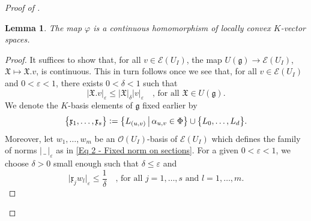 \documentclass[a4paper, reqno, 10pt]{amsart}
\newtheorem{lemma}[theorem]{Lemma}
\theoremstyle{definition}
\numberwithin{equation}{section}
\newcommand{\abs}[1]{{\lvert{#1}\rvert}}
\newcommand{\blank}{{\,\_\,}}
\newcommand{\defeq}{\vcentcolon=}
\newcommand{\mto}{\mapsto}
\newcommand{\ra}{\rightarrow}
\newcommand{\CE}{{\mathcal {E}}}
\newcommand{\CO}{{\mathcal {O}}}
\newcommand{\Fg}{{\mathfrak {g}}}
\newcommand{\Fx}{{\mathfrak {x}}}
\newcommand{\FX}{{\mathfrak {X}}}
\begin{document}
\begin{proof}[{Proof of }]
\begin{lemma}
	The map $\varphi$ is a continuous homomorphism of locally convex $K$-vector spaces.
\end{lemma}
\begin{proof}
	It suffices to show that, for all $v\in \CE(U_I)$, the map $U(\Fg) \ra \CE(U_I)$, $\FX \mto \FX.v$, is continuous.
	This in turn follows once we see that, for all $v\in \CE(U_I)$ and $0< \varepsilon < 1$, there exists $0< \delta < 1$ such that
	\begin{equation}\label{Eq 3 - Estimate for multiplication map}
		\lvert \FX.v \rvert_\varepsilon \leq \lvert \FX \rvert_\delta \lvert v \rvert_\varepsilon \quad\text{, for all $\FX \in U(\Fg)$.}
	\end{equation}
	We denote the $K$-basis elements of $\Fg$ fixed earlier by
	\begin{equation*}
		\big\{\Fx_1,\ldots,\Fx_s \big\} \defeq \big\{ L_{(u,v)} \,\big\vert\, \alpha_{u,v} \in \Phi \big\} \cup \big\{L_0,\ldots,L_d \big\} .
	\end{equation*}
	Moreover, let $w_1,\ldots,w_m$ be an $\CO(U_I)$-basis of $\CE(U_I)$ which defines the family of norms $\abs{\blank}_\varepsilon$ as in \eqref{Eq 2 - Fixed norm on sections}.
	For a given $0< \varepsilon < 1 $, we choose $\delta > 0 $ small enough such that $\delta \leq \varepsilon $ and
	\begin{equation*}
		\lvert \Fx_j w_l \rvert_\varepsilon \leq \frac{1}{\delta} \quad\text{, for all $j=1,\ldots,s$ and $l=1,\ldots,m$.}
	\end{equation*}


\end{proof}
\end{proof}
\end{document}
